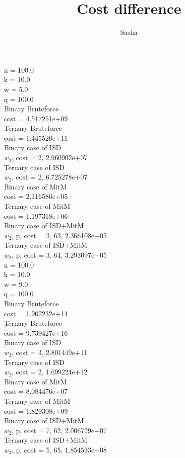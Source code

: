\documentclass[12pt]{article}
\title{Cost difference}
\author{ Sasha }
\begin{document}
\maketitle

n = 100.0 \\
k = 10.0 \\
w = 5.0 \\
q = 100.0 \\
Binary Bruteforce \\
cost = 4.517251e+09 \\
Ternary Bruteforce \\
cost = 1.445520e+11 \\
Binary case of ISD \\
$w_2$, cost = 2, 2.960902e+07 \\
Ternary case of ISD \\
$w_2$, cost = 2, 6.725278e+07 \\
Binary case of MitM \\
cost = 2.116580e+05 \\
Ternary case of MitM \\
cost = 1.197318e+06 \\
Binary case of ISD+MitM \\
$w_2$, p, cost = 3, 63, 2.366108e+05 \\
Ternary case of ISD+MitM \\
$w_2$, p, cost = 3, 64, 3.293097e+05 \\



n = 100.0 \\
k = 10.0 \\
w = 9.0 \\
q = 100.0 \\
Binary Bruteforce \\
cost = 1.902232e+14 \\
Ternary Bruteforce \\
cost = 9.739427e+16 \\
Binary case of ISD \\
$w_2$, cost = 3, 2.801449e+11 \\
Ternary case of ISD \\
$w_2$, cost = 2, 1.699224e+12 \\
Binary case of MitM \\
cost = 8.084476e+07 \\
Ternary case of MitM \\
cost = 1.829308e+09 \\
Binary case of ISD+MitM \\
$w_2$, p, cost = 7, 62, 2.006729e+07 \\
Ternary case of ISD+MitM \\
$w_2$, p, cost = 5, 65, 1.854533e+08 \\
\end{document}
